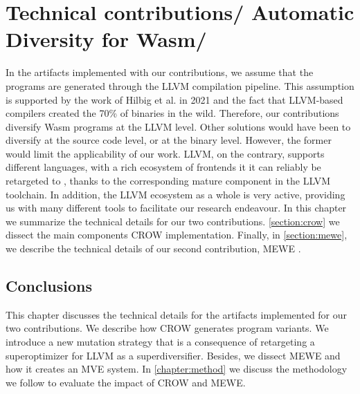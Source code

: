 \chapter{Technical contributions/ Automatic Diversity for Wasm/ }
\label{chapter:technical}




In the artifacts implemented with our contributions, we assume that the \wasm programs are generated through the LLVM compilation pipeline. This assumption is supported by the work of Hilbig et al. \cite{Hilbig2021AnES} in 2021 and the fact that LLVM-based compilers created the 70\% of \wasm binaries in the wild. Therefore,
our contributions diversify Wasm programs at the LLVM level. Other solutions would have been to diversify at the source code level, or at the \wasm binary level. However, the former would limit the applicability of our work. 
LLVM, on the contrary, supports different languages, with a rich ecosystem of frontends it it can reliably be retargeted to \wasm, thanks to the corresponding mature component in the LLVM toolchain. In addition, the LLVM ecosystem as a whole is very active, providing us with many different tools to facilitate our research endeavour.
In this chapter we summarize the technical details for our two contributions. \autoref{section:crow} we dissect the main components CROW \cite{CROW} implementation. Finally, in \autoref{section:mewe}, we describe the technical details of our second contribution, MEWE \cite{MEWE}.








\section*{Conclusions}

This chapter discusses the technical details for the artifacts implemented for our two contributions.
We describe how CROW generates program variants.
We introduce a new mutation strategy that is a consequence of retargeting a superoptimizer for LLVM as a superdiversifier.
Besides, we dissect MEWE and how it creates an MVE system.
In \autoref{chapter:method} we discuss the methodology we follow to evaluate the impact of CROW and MEWE.